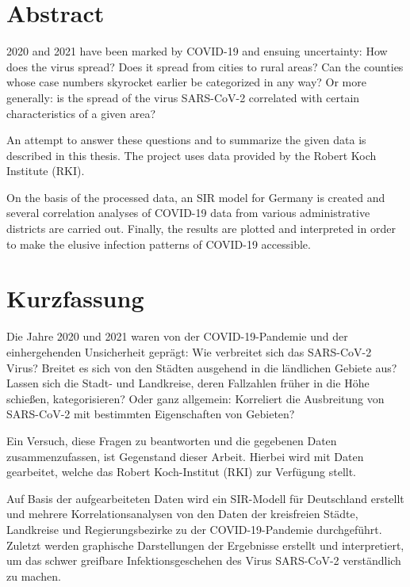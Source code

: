 \chapter*{Abstract}
2020 and 2021 have been marked by COVID-19 and ensuing uncertainty:
How does the virus spread? Does it spread from cities to rural areas? Can the counties whose case numbers skyrocket earlier be categorized in any way? Or more generally: is the spread of the virus SARS-CoV-2 correlated with certain characteristics of a given area?

An attempt to answer these questions and to summarize the given data is described in this thesis. The project uses data provided by the Robert Koch Institute (RKI).

On the basis of the processed data, an SIR model for Germany is created and several correlation analyses of COVID-19 data from various administrative districts are carried out.
Finally, the results are plotted and interpreted in order to make the elusive infection patterns of COVID-19  accessible.

\chapter*{Kurzfassung}
Die Jahre 2020 und 2021 waren von der COVID-19-Pandemie und der einhergehenden Unsicherheit geprägt:
Wie verbreitet sich das SARS-CoV-2 Virus? Breitet es sich von den Städten ausgehend in die ländlichen Gebiete aus? Lassen sich die Stadt- und Landkreise, deren Fallzahlen früher in die Höhe schießen, kategorisieren? Oder ganz allgemein: Korreliert die Ausbreitung von SARS-CoV-2 mit bestimmten Eigenschaften von Gebieten?

Ein Versuch, diese Fragen zu beantworten und die gegebenen Daten zusammenzufassen, ist Gegenstand dieser Arbeit. Hierbei wird mit Daten gearbeitet, welche das Robert Koch-Institut (RKI) zur Verfügung stellt.

Auf Basis der aufgearbeiteten Daten wird ein SIR-Modell für Deutschland erstellt und mehrere Korrelationsanalysen von den Daten der kreisfreien Städte, Landkreise und Regierungsbezirke zu der COVID-19-Pandemie durchgeführt.
Zuletzt werden graphische Darstellungen der Ergebnisse erstellt und interpretiert, um das schwer greifbare Infektionsgeschehen des Virus SARS-CoV-2 verständlich zu machen.
\newpage